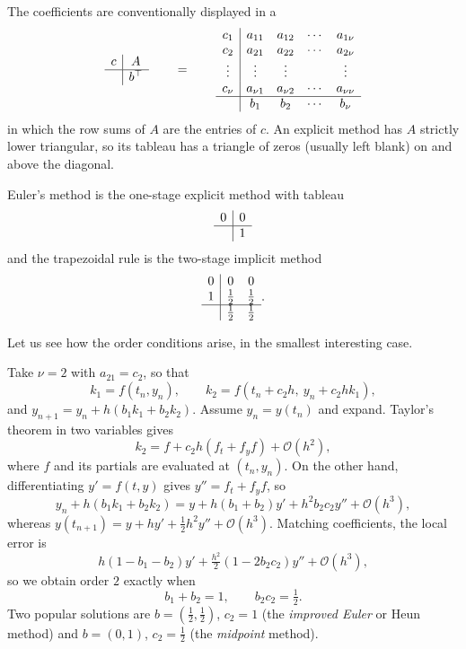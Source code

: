 The coefficients are conventionally displayed in a 
$$
\begin{array}{c|c}
  c & A\\ \hline
    & b^\top
\end{array}
\qquad = \qquad
\begin{array}{c|cccc}
  c_1 & a_{11} & a_{12} & \cdots & a_{1\nu}\\
  c_2 & a_{21} & a_{22} & \cdots & a_{2\nu}\\
  \vdots & \vdots & \vdots & & \vdots\\
  c_\nu & a_{\nu 1} & a_{\nu 2} & \cdots & a_{\nu\nu}\\
  \hline
      & b_1 & b_2 & \cdots & b_\nu
\end{array}
$$
in which the row sums of $A$ are the entries of $c$. An explicit method has $A$ strictly lower triangular, so its tableau has a triangle of zeros (usually left blank) on and above the diagonal.

\begin{example}
  Euler's method is the one-stage explicit method with tableau
  $$
  \begin{array}{c|c}
    0 & 0\\\hline & 1
  \end{array}
  $$
  and the trapezoidal rule is the two-stage implicit method
  $$
  \begin{array}{c|cc}
    0 & 0 & 0\\
    1 & \tfrac12 & \tfrac12\\\hline
      & \tfrac12 & \tfrac12
  \end{array}.
  $$
\end{example}

Let us see how the order conditions arise, in the smallest interesting case.

\begin{example}\label{eg:rk2}
  Take $\nu = 2$ with $a_{21} = c_2$, so that
  $$
  k_1 = f(t_n,y_n), \qquad k_2 = f(t_n + c_2h,\ y_n + c_2hk_1),
  $$
  and $y_{n+1} = y_n + h(b_1k_1 + b_2k_2)$. Assume $y_n = y(t_n)$ and expand. Taylor's theorem in two variables gives
  $$
  k_2 = f + c_2h\left(f_t + f_y f\right) + \mathcal{O}(h^2),
  $$
  where $f$ and its partials are evaluated at $(t_n,y_n)$. On the other hand, differentiating $y' = f(t,y)$ gives $y'' = f_t + f_y f$, so
  $$
  y_n + h(b_1k_1 + b_2k_2) = y + h(b_1 + b_2)y' + h^2 b_2c_2 y'' + \mathcal{O}(h^3),
  $$
  whereas $y(t_{n+1}) = y + hy' + \tfrac12 h^2 y'' + \mathcal{O}(h^3)$. Matching coefficients, the local error is
  $$
  h(1 - b_1 - b_2)y' + \tfrac{h^2}{2}(1 - 2b_2c_2)y'' + \mathcal{O}(h^3),
  $$
  so we obtain order $2$ exactly when
  $$
  b_1 + b_2 = 1, \qquad b_2c_2 = \tfrac12 .
  $$
  Two popular solutions are $b = (\tfrac12,\tfrac12)$, $c_2 = 1$ (the \emph{improved Euler} or Heun method) and $b = (0,1)$, $c_2 = \tfrac12$ (the \emph{midpoint} method).
\end{example}

